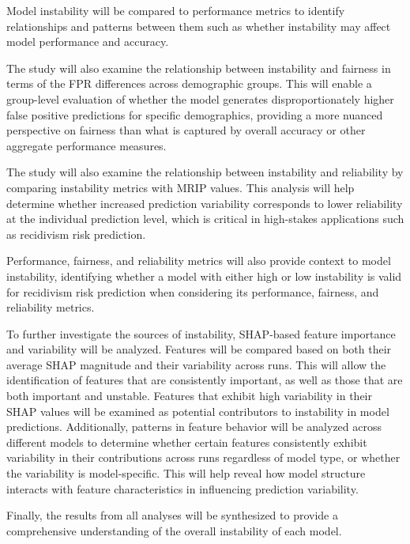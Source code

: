 \documentclass[12pt]{article}
\begin{document}
\begin{enumerate}
  Model instability will be compared to performance metrics to identify relationships and patterns between them such as  whether instability may affect model performance and accuracy. 

  The study will also examine the relationship between instability and fairness in terms of the FPR differences across demographic groups. This will enable a group-level evaluation of whether the model generates disproportionately higher false positive predictions for specific demographics, providing a more nuanced perspective on fairness than what is captured by overall accuracy or other aggregate performance measures.

  The study will also examine the relationship between instability and reliability by comparing instability metrics with MRIP values. This analysis will help determine whether increased prediction variability corresponds to lower reliability at the individual prediction level, which is critical in high-stakes applications such as recidivism risk prediction.

  Performance, fairness, and reliability metrics will also provide context to model instability, identifying whether a model with either high or low instability is valid for recidivism risk prediction when considering its performance, fairness, and reliability metrics.

  To further investigate the sources of instability, SHAP-based feature importance and variability will be analyzed. Features will be compared based on both their average SHAP magnitude and their variability across runs. This will allow the identification of features that are consistently important, as well as those that are both important and unstable. Features that exhibit high variability in their SHAP values will be examined as potential contributors to instability in model predictions. Additionally, patterns in feature behavior will be analyzed across different models to determine whether certain features consistently exhibit variability in their contributions across runs regardless of model type, or whether the variability is model-specific. This will help reveal how model structure interacts with feature characteristics in influencing prediction variability.

  Finally, the results from all analyses will be synthesized to provide a comprehensive understanding of the overall instability of each model. 
\end{enumerate}
\newpage
\end{document}
